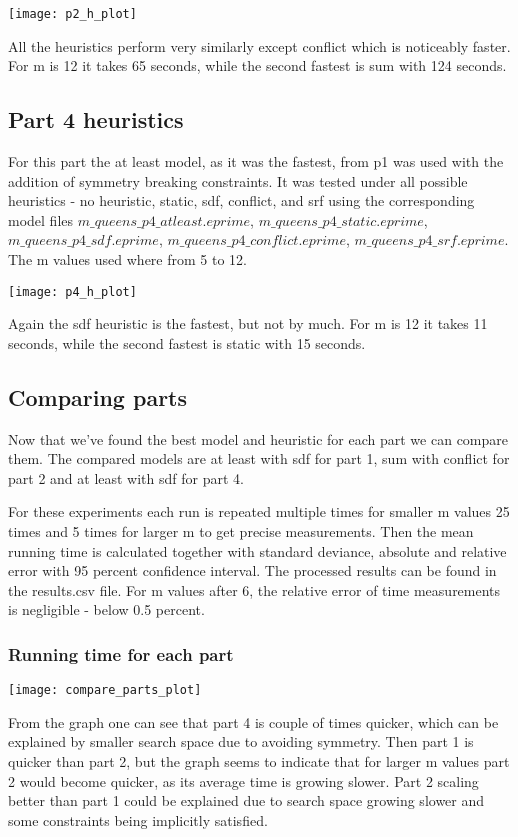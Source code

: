 \documentclass{article}
\begin{document}
\texttt{[image: p2\_h\_plot]}

All the heuristics perform very similarly except conflict which is noticeably faster. For m is 12 it takes 65 seconds, while the second fastest is sum with 124 seconds.

\subsection{Part 4 heuristics}

For this part the at least model, as it was the fastest, from p1 was used with the addition of symmetry breaking constraints. It was tested under all possible heuristics - no heuristic, static, sdf, conflict, and srf using the corresponding model files $m\_queens\_p4\_atleast.eprime$, $m\_queens\_p4\_static.eprime$, $m\_queens\_p4\_sdf.eprime$, $m\_queens\_p4\_conflict.eprime$, $m\_queens\_p4\_srf.eprime$. The m values used where from 5 to 12.

\texttt{[image: p4\_h\_plot]}

Again the sdf heuristic is the fastest, but not by much. For m is 12 it takes 11 seconds, while the second fastest is static with 15 seconds.

\subsection{Comparing parts}

Now that we've found the best model and heuristic for each part we can compare them. The compared models are at least with sdf for part 1, sum with conflict for part 2 and at least with sdf for part 4.

For these experiments each run is repeated multiple times for smaller m values 25 times and 5 times for larger m to get precise measurements. Then the mean running time is calculated together with standard deviance, absolute and relative error with 95 percent confidence interval. The processed results can be found in the results.csv file. For m values after 6, the relative error of time measurements is negligible - below 0.5 percent.

\subsubsection{Running time for each part}
\texttt{[image: compare\_parts\_plot]}

From the graph one can see that part 4 is couple of times quicker, which can be explained by smaller search space due to avoiding symmetry. Then part 1 is quicker than part 2, but the graph seems to indicate that for larger m values part 2 would become quicker, as its average time is growing slower. Part 2 scaling better than part 1 could be explained due to search space growing slower and some constraints being implicitly satisfied.
\end{document}
